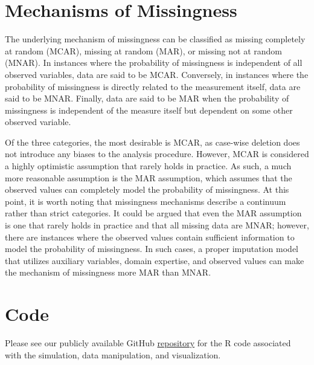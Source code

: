 \documentclass[
  letterpaper,
  DIV=11,
  numbers=noendperiod]{scrreprt}
\begin{document}
\hypertarget{mechanisms-of-missingness}{%
\section*{Mechanisms of Missingness}\label{mechanisms-of-missingness}}

The underlying mechanism of missingness can be classified as missing
completely at random (MCAR), missing at random (MAR), or missing not at
random (MNAR). In instances where the probability of missingness is
independent of all observed variables, data are said to be MCAR.
Conversely, in instances where the probability of missingness is
directly related to the measurement itself, data are said to be MNAR.
Finally, data are said to be MAR when the probability of missingness is
independent of the measure itself but dependent on some other observed
variable.

Of the three categories, the most desirable is MCAR, as case-wise
deletion does not introduce any biases to the analysis procedure.
However, MCAR is considered a highly optimistic assumption that rarely
holds in practice. As such, a much more reasonable assumption is the MAR
assumption, which assumes that the observed values can completely model
the probability of missingness. At this point, it is worth noting that
missingness mechanisms describe a continuum rather than strict
categories. It could be argued that even the MAR assumption is one that
rarely holds in practice and that all missing data are MNAR; however,
there are instances where the observed values contain sufficient
information to model the probability of missingness. In such cases, a
proper imputation model that utilizes auxiliary variables, domain
expertise, and observed values can make the mechanism of missingness
more MAR than MNAR.

\hypertarget{code}{%
\section*{Code}\label{code}}

Please see our publicly available GitHub
\href{https://github.com/ieb2/jackknife_var_est.git}{repository} for the
R code associated with the simulation, data manipulation, and
visualization.
\end{document}
